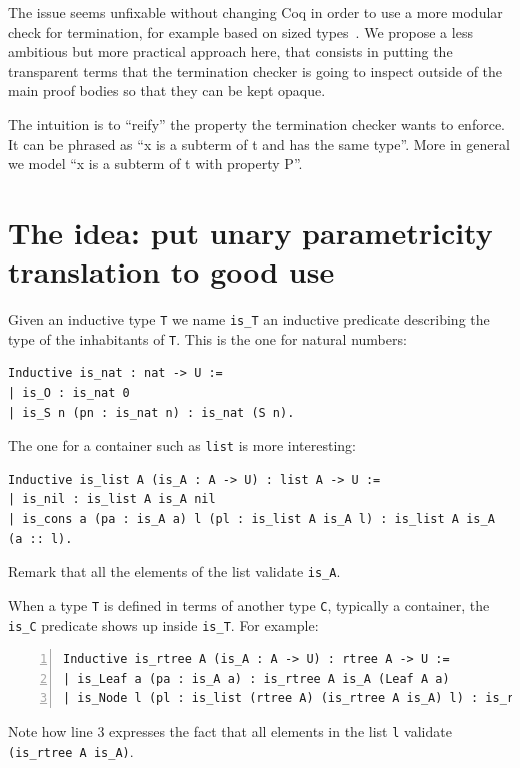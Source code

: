 \documentclass[a4paper,UKenglish,cleveref, autoref]{lipics-v2019}
\begin{document}
The issue seems unfixable without changing Coq in order to use a more
modular check for termination, for example based on sized
types~\cite{DBLP:journals/scp/Abel09}.
We propose a less ambitious but more practical approach here, that
consists in putting the transparent terms that the termination checker
is going to inspect outside of the main proof bodies so that they can be 
kept opaque.

The intuition is to ``reify'' the property the termination checker wants
to enforce. It can be phrased as ``x is a subterm of t and has the same
type''. More in general we model ``x is a subterm of t with property
P''.

\section{The idea: put unary parametricity translation to good use}
\label{sec:idea}

Given an inductive type \lstinline+T+ we name \lstinline+is_T+
an inductive predicate describing the type of the inhabitants of
\lstinline+T+. This is the one for natural numbers:
\begin{lstlisting}
Inductive is_nat : nat -> U :=
| is_O : is_nat 0
| is_S n (pn : is_nat n) : is_nat (S n).
\end{lstlisting}

\noindent
The one for a container such as \lstinline+list+ is more interesting:
\begin{lstlisting}
Inductive is_list A (is_A : A -> U) : list A -> U :=
| is_nil : is_list A is_A nil
| is_cons a (pa : is_A a) l (pl : is_list A is_A l) : is_list A is_A (a :: l).
\end{lstlisting}

\noindent
Remark that all the elements of the list validate \lstinline+is_A+.

When a type \lstinline+T+ is defined in terms of another type
\lstinline+C+, typically a container, the \lstinline+is_C+ predicate
shows up inside \lstinline+is_T+. For example:
\begin{lstlisting}[numbers=left]
Inductive is_rtree A (is_A : A -> U) : rtree A -> U :=
| is_Leaf a (pa : is_A a) : is_rtree A is_A (Leaf A a)
| is_Node l (pl : is_list (rtree A) (is_rtree A is_A) l) : is_rtree A is_A (Node A l).
\end{lstlisting}

\noindent
Note how line 3 expresses the fact that all elements in the list
\lstinline+l+ validate \lstinline+(is_rtree A is_A)+.
\end{document}
